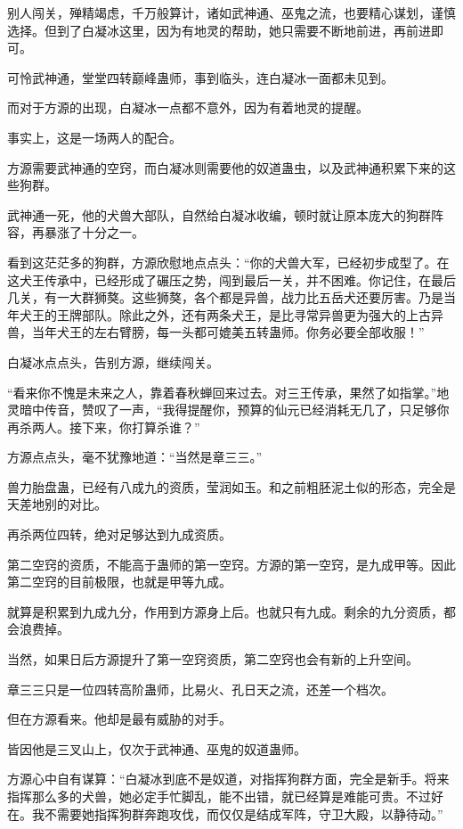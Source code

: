 
\begin{this_body}

别人闯关，殚精竭虑，千万般算计，诸如武神通、巫鬼之流，也要精心谋划，谨慎选择。但到了白凝冰这里，因为有地灵的帮助，她只需要不断地前进，再前进即可。

可怜武神通，堂堂四转巅峰蛊师，事到临头，连白凝冰一面都未见到。

而对于方源的出现，白凝冰一点都不意外，因为有着地灵的提醒。

事实上，这是一场两人的配合。

方源需要武神通的空窍，而白凝冰则需要他的奴道蛊虫，以及武神通积累下来的这些狗群。

武神通一死，他的犬兽大部队，自然给白凝冰收编，顿时就让原本庞大的狗群阵容，再暴涨了十分之一。

看到这茫茫多的狗群，方源欣慰地点点头：“你的犬兽大军，已经初步成型了。在这犬王传承中，已经形成了碾压之势，闯到最后一关，并不困难。你记住，在最后几关，有一大群狮獒。这些狮獒，各个都是异兽，战力比五岳犬还要厉害。乃是当年犬王的王牌部队。除此之外，还有两条犬王，是比寻常异兽更为强大的上古异兽，当年犬王的左右臂膀，每一头都可媲美五转蛊师。你务必要全部收服！”

白凝冰点点头，告别方源，继续闯关。

“看来你不愧是未来之人，靠着春秋蝉回来过去。对三王传承，果然了如指掌。”地灵暗中传音，赞叹了一声，“我得提醒你，预算的仙元已经消耗无几了，只足够你再杀两人。接下来，你打算杀谁？”

方源点点头，毫不犹豫地道：“当然是章三三。”

兽力胎盘蛊，已经有八成九的资质，莹润如玉。和之前粗胚泥土似的形态，完全是天差地别的对比。

再杀两位四转，绝对足够达到九成资质。

第二空窍的资质，不能高于蛊师的第一空窍。方源的第一空窍，是九成甲等。因此第二空窍的目前极限，也就是甲等九成。

就算是积累到九成九分，作用到方源身上后。也就只有九成。剩余的九分资质，都会浪费掉。

当然，如果日后方源提升了第一空窍资质，第二空窍也会有新的上升空间。

章三三只是一位四转高阶蛊师，比易火、孔日天之流，还差一个档次。

但在方源看来。他却是最有威胁的对手。

皆因他是三叉山上，仅次于武神通、巫鬼的奴道蛊师。

方源心中自有谋算：“白凝冰到底不是奴道，对指挥狗群方面，完全是新手。将来指挥那么多的犬兽，她必定手忙脚乱，能不出错，就已经算是难能可贵。不过好在。我不需要她指挥狗群奔跑攻伐，而仅仅是结成军阵，守卫大殿，以静待动。”


\end{this_body}
